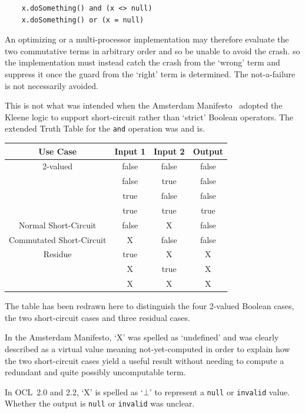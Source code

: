 \documentclass{jot}
\begin{document}
\begin{verbatim}
    x.doSomething() and (x <> null) 
    x.doSomething() or (x = null) 
\end{verbatim}

An optimizing or a multi-processor implementation may therefore evaluate the two commutative terms in arbitrary order and so be unable to avoid the crash. so the implementation must instead catch the crash from the `wrong' term and suppress it once the guard from the `right' term is determined. The not-a-failure is not necessarily avoided.

This is not what was intended when the Amsterdam Manifesto~\cite{OCL-Amsterdam} adopted the Kleene logic to support short-circuit rather than `strict' Boolean operators. The extended Truth Table for the \verb$and$ operation was and is.

\begin{center}
	\begin{tabular}{|c||c|c||c|}
		\hline
		Use Case & Input 1 & Input 2 & Output \\
		\hline
		\hline
		2-valued & false & false & false \\
		& false & true & false \\
		&  true & false & false \\
		& true & true & true \\
		\hline
		Normal Short-Circuit & false & X & false \\
		Commutated Short-Circuit & X & false & false \\
		\hline
		Residue & true & X & X \\
		& X & true & X \\
		& X & X & X \\
		\hline
	\end{tabular}
\end{center}

The table has been redrawn here to distinguish the four 2-valued Boolean cases, the two short-circuit cases and three residual cases.

In the Amsterdam Manifesto, `X' was spelled as `undefined' and was clearly described as a virtual value meaning not-yet-computed in order to explain how the two short-circuit cases yield a useful result without needing to compute a redundant and quite possibly uncomputable term.

In OCL~2.0 and 2.2, `X' is spelled as `$\bot$' to represent a \verb$null$ or \verb$invalid$ value. Whether the output is \verb$null$ or \verb$invalid$ was unclear.
\end{document}
